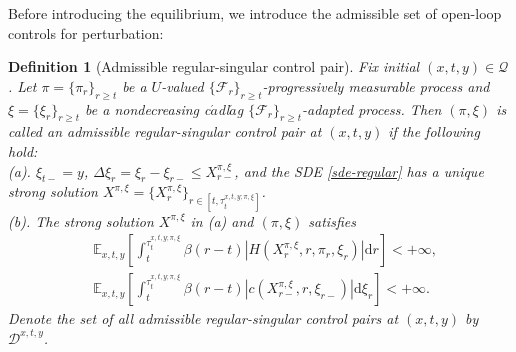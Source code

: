 \documentclass[11pt,reqno]{article}%
\newtheorem{definition}[theorem]{Definition}
\numberwithin{equation}{section}
\begin{document}
Before introducing the equilibrium, we introduce the admissible set of open-loop controls for perturbation:
\begin{definition}[Admissible regular-singular control pair]\label{admissible2}
Fix initial $(x,t,y)\in\mathcal{Q}$. Let $\pi=\{\pi_{r}\}_{r\ge t}$ be a $U$-valued $\{\mathcal{F}_{r}\}_{r\ge t}$-progressively measurable process and $\xi=\{\xi_{r}\}_{r\ge t}$ be a nondecreasing c$\acute{a}$dl$\acute{a}$g $\{\mathcal{F}_{r}\}_{r\ge t}$-adapted process. Then $(\pi,\xi)$ is called an admissible regular-singular control pair at $(x,t,y)$ if the following hold:\\
(a). $\xi_{t-}=y$, $\Delta \xi_r=\xi_r-\xi_{r-}\le X_{r-}^{\pi,\xi}$, and the SDE \eqref{sde-regular} has a unique strong solution $X^{\pi,\xi}=\{X^{\pi,\xi}_{r}\}_{r\in [t,\tau^{x,t,y;\pi,\xi}_{t}]}$.\\
(b). The strong solution $X^{\pi,\xi}$ in (a) and $(\pi,\xi)$ satisfies
\begin{equation}
\begin{aligned}
&\mathbb{E}_{x, t, y}\left[\int_t^{\tau^{x,t,y;\pi,\xi}_{t}} \beta(r-t) \left|H\left(X_r^{\pi,\xi}, r, \pi_r, \xi_r \right)\right| \mathrm{d} r\right]<+\infty,\\
&\mathbb{E}_{x, t, y}\left[\int_t^{\tau^{x,t,y;\pi,\xi}_{t}} \beta(r-t) \left|c\left(X_{r-}^{\pi,\xi}, r, \xi_{r-}\right)\right| \mathrm{d} \xi_r\right]<+\infty.
\end{aligned}\nonumber
\end{equation}
Denote the set of all admissible regular-singular control pairs at $(x,t,y)$ by $\mathcal{D}^{x,t,y}$. 


\end{definition}
\end{document}
